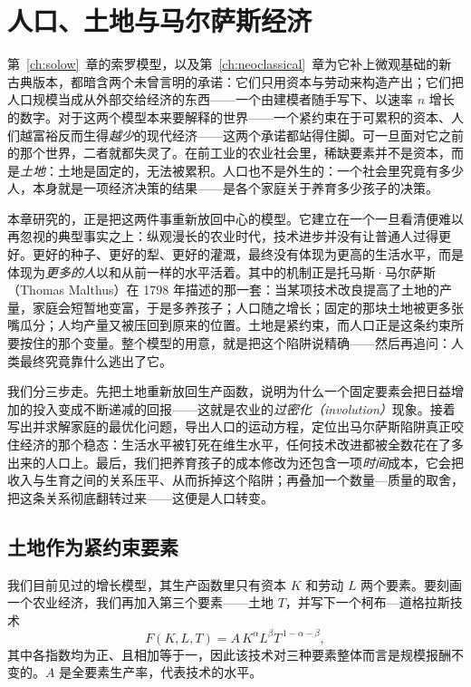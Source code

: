 \chapter{人口、土地与马尔萨斯经济}
\label{ch:malthus}

第~\ref{ch:solow}~章的索罗模型，以及第~\ref{ch:neoclassical}~章为它补上微观基础的新古典版本，都暗含两个未曾言明的承诺：它们只用资本与劳动来构造产出；它们把人口规模当成从外部交给经济的东西——一个由建模者随手写下、以速率 $n$ 增长的数字。对于这两个模型本来要解释的世界——一个紧约束在于可累积的资本、人们越富裕反而生得\emph{越少}的现代经济——这两个承诺都站得住脚。可一旦面对它之前的那个世界，二者就都失灵了。在前工业的农业社会里，稀缺要素并不是资本，而是\emph{土地}：土地是固定的，无法被累积。人口也不是外生的：一个社会里究竟有多少人，本身就是一项经济决策的结果——是各个家庭关于养育多少孩子的决策。

本章研究的，正是把这两件事重新放回中心的模型。它建立在一个一旦看清便难以再忽视的典型事实之上：纵观漫长的农业时代，技术进步并没有让普通人过得更好。更好的种子、更好的犁、更好的灌溉，最终没有体现为更高的生活水平，而是体现为\emph{更多的人}以和从前一样的水平活着。其中的机制正是托马斯·马尔萨斯（Thomas Malthus）在 1798 年描述的那一套：当某项技术改良提高了土地的产量，家庭会短暂地变富，于是多养孩子；人口随之增长；固定的那块土地被更多张嘴瓜分；人均产量又被压回到原来的位置。土地是紧约束，而人口正是这条约束所要按住的那个变量。整个模型的用意，就是把这个陷阱说精确——然后再追问：人类最终究竟靠什么逃出了它。

我们分三步走。先把土地重新放回生产函数，说明为什么一个固定要素会把日益增加的投入变成不断递减的回报——这就是农业的\emph{过密化（involution）}现象。接着写出并求解家庭的最优化问题，导出人口的运动方程，定位出马尔萨斯陷阱真正咬住经济的那个稳态：生活水平被钉死在维生水平，任何技术改进都被全数花在了多出来的人口上。最后，我们把养育孩子的成本修改为还包含一项\emph{时间}成本，它会把收入与生育之间的关系压平、从而拆掉这个陷阱；再叠加一个数量—质量的取舍，把这条关系彻底翻转过来——这便是人口转变。

\section{土地作为紧约束要素}

我们目前见过的增长模型，其生产函数里只有资本 $K$ 和劳动 $L$ 两个要素。要刻画一个农业经济，我们再加入第三个要素——土地 $T$，并写下一个柯布—道格拉斯技术
\begin{equation}
F(K, L, T) = A\, K^{\alpha} L^{\beta} T^{\,1-\alpha-\beta},
\label{eq:malthus-prod}
\end{equation}
其中各指数均为正、且相加等于一，因此该技术对三种要素整体而言是规模报酬不变的。$A$ 是全要素生产率，代表技术的水平。

